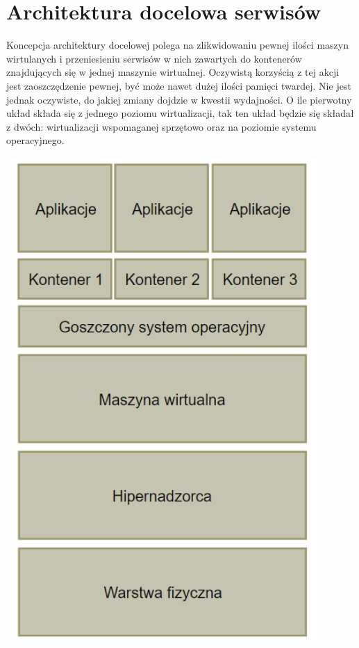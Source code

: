 \documentclass[polish, a4paper, 12pt, oneside]{book}
\begin{document}
\section{Architektura docelowa serwisów}
Koncepcja architektury docelowej polega na zlikwidowaniu pewnej ilości maszyn wirtulanych i przeniesieniu serwisów w nich zawartych do kontenerów znajdujących się w jednej maszynie wirtualnej. Oczywistą korzyścią z tej akcji jest zaoszczędzenie pewnej, być może nawet dużej ilości  pamięci twardej. Nie jest jednak oczywiste, do jakiej zmiany dojdzie w kwestii wydajności. O ile pierwotny układ składa się z jednego poziomu wirtualizacji, tak ten układ będzie się składał z dwóch: wirtualizacji wspomaganej sprzętowo oraz na poziomie systemu operacyjnego.
\begin{center}
\includegraphics[width=120mm]{schemat_archdoc.png}
\end{center}
\end{document}
